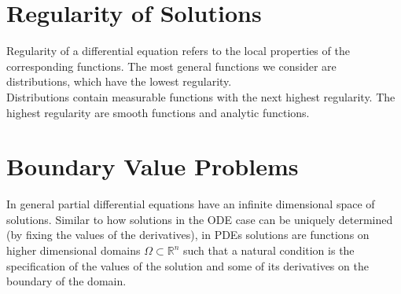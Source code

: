\section{Regularity of Solutions} %
\label{sec:Regularity of Solutions}
Regularity of a differential equation refers to the local properties of the corresponding functions.
The most general functions we consider are distributions, which have the lowest regularity.\\[1ex]
Distributions contain measurable functions with the next highest regularity.
The highest regularity are smooth functions and analytic functions.
\section{Boundary Value Problems} %
\label{sec:Boundary Value Problems}
In general partial differential equations have an infinite dimensional space of solutions.
Similar to how solutions in the ODE case can be uniquely determined (by fixing the values of the derivatives),
in PDEs solutions are functions on higher dimensional domains $\Omega  \subset  \mathbb{R}^{n}  $ such that a natural condition is the specification of the values of the solution
and some of its derivatives on the boundary of the domain.
